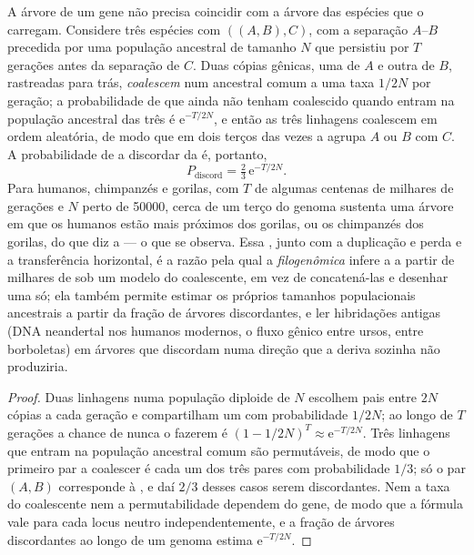 \begin{proposition}\label{prop:b3:molecular-evolution:ils}
A árvore de um gene não precisa coincidir com a árvore das espécies que o
carregam. Considere três espécies com  $((A,B),C)$,
com a separação $A$--$B$ precedida por uma população ancestral de tamanho
$N$ que persistiu por $T$ gerações antes da separação de $C$. Duas cópias
gênicas, uma de $A$ e outra de $B$, rastreadas para trás,
\emph{coalescem} num ancestral comum a uma taxa $1/2N$ por geração; a
probabilidade de que ainda não tenham coalescido quando entram na
população ancestral das três é $\mathrm{e}^{-T/2N}$, e então as três
linhagens coalescem em ordem aleatória, de modo que em dois terços das
vezes a  agrupa $A$ ou $B$ com $C$. A probabilidade de a
 discordar da  é, portanto,
\[
P_{\text{discord}} = \tfrac{2}{3}\,\mathrm{e}^{-T/2N} .
\]
Para humanos, chimpanzés e gorilas, com $T$ de algumas centenas de
milhares de gerações e $N$ perto de \num{50000}, cerca de um terço do
genoma sustenta uma árvore em que os humanos estão mais próximos dos
gorilas, ou os chimpanzés dos gorilas, do que diz a 
--- o que se observa. Essa \emph{},
junto com a duplicação e perda e a transferência horizontal, é a razão
pela qual a \emph{filogenômica} infere a  a partir de
milhares de  sob um modelo do coalescente, em vez de
concatená-las e desenhar uma só; ela também permite estimar os próprios
tamanhos populacionais ancestrais a partir da fração de árvores
discordantes, e ler hibridações antigas (DNA neandertal nos humanos
modernos, o fluxo gênico entre ursos, entre borboletas) em árvores que
discordam numa direção que a deriva sozinha não produziria.
\end{proposition}
\begin{proof}
Duas linhagens numa população diploide de $N$ escolhem pais entre $2N$
cópias a cada geração e compartilham um com probabilidade $1/2N$; ao
longo de $T$ gerações a chance de nunca o fazerem é $(1 - 1/2N)^{T} \approx
\mathrm{e}^{-T/2N}$. Três linhagens que entram na população
ancestral comum são permutáveis, de modo que o primeiro par a coalescer é
cada um dos três pares com probabilidade $1/3$; só o par $(A,B)$
corresponde à , e daí $2/3$ desses casos serem
discordantes. Nem a taxa do coalescente nem a permutabilidade dependem do
gene, de modo que a fórmula vale para cada locus neutro
independentemente, e a fração de árvores discordantes ao longo de um
genoma estima $\mathrm{e}^{-T/2N}$.
\end{proof}

